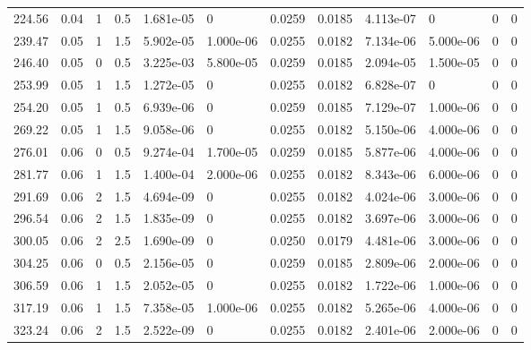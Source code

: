 \documentclass[preview]{standalone}
\begin{document}
{{\begin{tabular}{L{1.2cm}C{1.2cm} C{0.3cm}C{0.5cm} C{1.4cm}C{1.4cm} C{1.4cm}C{1.4cm} C{1.6cm}C{1.6cm} C{1.6cm}C{1.6cm}}
  224.56  &  0.04  & 1     & 0.5 &  1.681e-05  & 0  &  0.0259&   0.0185& 4.113e-07 & 0   &  0 & 0  \\ 
  239.47  &  0.05  & 1     & 1.5 &  5.902e-05  & 1.000e-06  &  0.0255&   0.0182& 7.134e-06 & 5.000e-06   &  0 & 0  \\ 
  246.40  &  0.05  & 0     & 0.5 &  3.225e-03  & 5.800e-05  &  0.0259&   0.0185& 2.094e-05 & 1.500e-05   &  0 & 0  \\ 
  253.99  &  0.05  & 1     & 1.5 &  1.272e-05  & 0  &  0.0255&   0.0182& 6.828e-07 & 0   &  0 & 0  \\ 
  254.20  &  0.05  & 1     & 0.5 &  6.939e-06  & 0  &  0.0259&   0.0185& 7.129e-07 & 1.000e-06   &  0 & 0  \\ 
  269.22  &  0.05  & 1     & 1.5 &  9.058e-06  & 0  &  0.0255&   0.0182& 5.150e-06 & 4.000e-06   &  0 & 0  \\ 
  276.01  &  0.06  & 0     & 0.5 &  9.274e-04  & 1.700e-05  &  0.0259&   0.0185& 5.877e-06 & 4.000e-06   &  0 & 0  \\ 
  281.77  &  0.06  & 1     & 1.5 &  1.400e-04  & 2.000e-06  &  0.0255&   0.0182& 8.343e-06 & 6.000e-06   &  0 & 0  \\ 
  291.69  &  0.06  & 2     & 1.5 &  4.694e-09  & 0  &  0.0255&   0.0182& 4.024e-06 & 3.000e-06   &  0 & 0  \\ 
  296.54  &  0.06  & 2     & 1.5 &  1.835e-09  & 0  &  0.0255&   0.0182& 3.697e-06 & 3.000e-06   &  0 & 0  \\ 
  300.05  &  0.06  & 2     & 2.5 &  1.690e-09  & 0  &  0.0250&   0.0179& 4.481e-06 & 3.000e-06   &  0 & 0  \\ 
  304.25  &  0.06  & 0     & 0.5 &  2.156e-05  & 0  &  0.0259&   0.0185& 2.809e-06 & 2.000e-06   &  0 & 0  \\ 
  306.59  &  0.06  & 1     & 1.5 &  2.052e-05  & 0  &  0.0255&   0.0182& 1.722e-06 & 1.000e-06   &  0 & 0  \\ 
  317.19  &  0.06  & 1     & 1.5 &  7.358e-05  & 1.000e-06  &  0.0255&   0.0182& 5.265e-06 & 4.000e-06   &  0 & 0  \\ 
  323.24  &  0.06  & 2     & 1.5 &  2.522e-09  & 0  &  0.0255&   0.0182& 2.401e-06 & 2.000e-06   &  0 & 0  \\ 
\hline 
\end{tabular} 

}}
\end{document}

